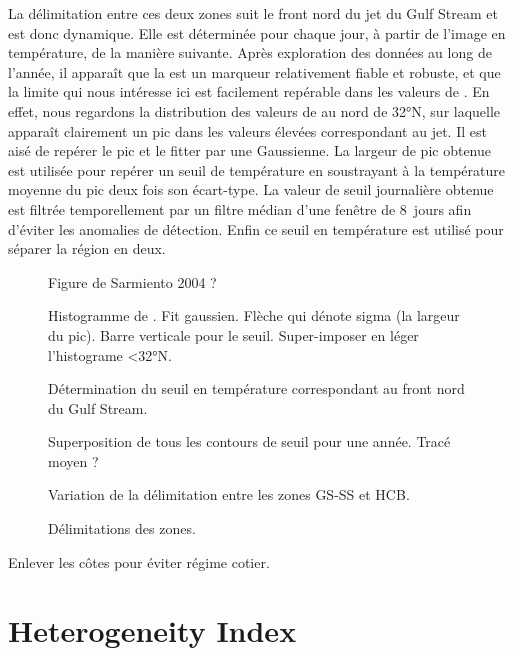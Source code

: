 \documentclass[index]{subfiles}
\begin{document}
La délimitation entre ces deux zones suit le front nord du jet du Gulf Stream et est donc dynamique. Elle est déterminée pour chaque jour, à partir de l'image en température, de la manière suivante.
Après exploration des données au long de l'année, il apparaît que la  est un marqueur relativement fiable et robuste, et que la limite qui nous intéresse ici est facilement repérable dans les valeurs de .
En effet, nous regardons la distribution des valeurs de  au nord de \ang{32}N, sur laquelle apparaît clairement un pic dans les valeurs élevées correspondant au jet.
Il est aisé de repérer le pic et le fitter par une Gaussienne.
La largeur de pic obtenue est utilisée pour repérer un seuil de température en soustrayant à la température moyenne du pic deux fois son écart-type.
La valeur de seuil journalière obtenue est filtrée temporellement par un filtre médian d'une fenêtre de 8~jours afin d'éviter les anomalies de détection.
Enfin ce seuil en température est utilisé pour séparer la région en deux.

\begin{figure}
  \caption{Figure de Sarmiento 2004 ?}
  \label{fig:sarmiento}
\end{figure}

\begin{figure}
  Histogramme de . Fit gaussien. Flèche qui dénote sigma (la largeur du pic).
  Barre verticale pour le seuil.
  Super-imposer en léger l'histograme <32°N.
  \caption{Détermination du seuil en température correspondant au front nord du Gulf Stream.}
  \label{fig:seuil-temp}
\end{figure}


\begin{figure}
  Superposition de tous les contours de seuil pour une année.
  Tracé moyen ?
  \caption{Variation de la délimitation entre les zones GS-SS et HCB.}
  \label{fig:var-delim}
\end{figure}


\begin{figure}
  \caption{Délimitations des zones.}
  \label{fig:zone-delimitation}
\end{figure}

Enlever les côtes pour éviter régime cotier.

\section{Heterogeneity Index}
\label{sec:HI}
\end{document}
